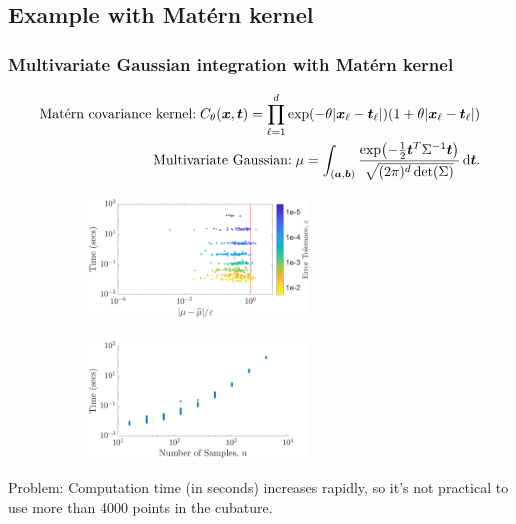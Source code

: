 \documentclass[handout, 10pt,compress,xcolor={usenames,dvipsnames}]{beamer} %
\renewcommand{\mSigma}{\Sigma}
\newcommand{\dvt}{\dif {\vt}}
\begin{document}
\subsection{Example with Mat\'ern  kernel}
\begin{frame}
\frametitle{Multivariate Gaussian integration with Mat\'ern kernel}
\vspace{-6ex}
\begin{align}
\label{eqn:matern_kernel}
\text{Mat\'ern covariance kernel:} \; C_{\theta}(\vx, \vt) = \prod_{\ell=1}^d \exp(-\theta|\vx_\ell-\vt_\ell|)(1+\theta |\vx_\ell-\vt_\ell|) \\
\text{Multivariate Gaussian:} \; 
\label{eqn:GaussDef}
\mu = \int_{(\va,\vb)} \frac{\exp\bigl(- \frac 12 \vt^T \mSigma^{-1} \vt \bigr)}{\sqrt{(2 \pi)^d \det(\mSigma)}} \, \dvt.
\end{align}

\vspace{-3ex}

\begin{figure}[htp]
\captionsetup[subfigure]{labelformat=empty}
\centering
\begin{subfigure}[b]{0.49\textwidth}
\includegraphics[height=3.25cm]{../figures/MVN_guaranteed_time_Matern_d2_2019-Jun-29}
\end{subfigure}
\centering
\begin{subfigure}[b]{0.49\textwidth}
\includegraphics[height=3.25cm]{../figures/MVN_rapid_n_vs_time_Matern_d2_2019-Jun-29}
\end{subfigure}
\label{fig:MVN_Metern_d2b2}
\end{figure}
\alert{Problem}: Computation time (in seconds) increases rapidly, so it's not practical to use more than 4000 points in the cubature.
\end{frame}
\end{document}

